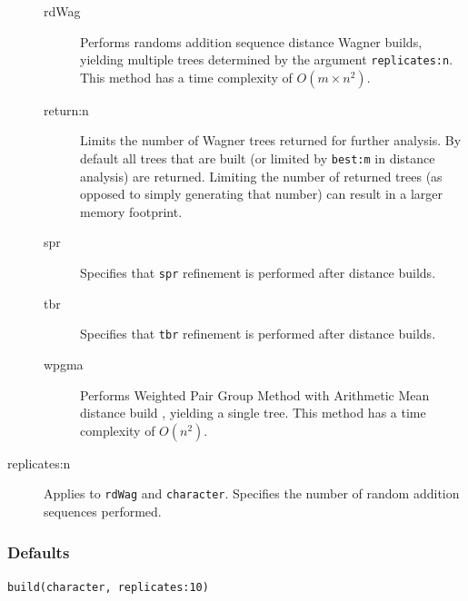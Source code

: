 \begin{description}
\begin{description}
			\item[rdWag] Performs randoms addition sequence distance Wagner builds, 
			yielding multiple trees determined by the argument \texttt{replicates:n}. This 
			method has a time complexity of $O(m \times n^2)$.
			
			\item[return:n] Limits the number of Wagner trees returned for further analysis.  By default
			all trees that are built (or limited by \texttt{best:m} in distance analysis) are returned.
			Limiting the number of returned trees (as opposed to simply generating that number) can result in
			a larger memory footprint.

			\item[spr] Specifies that \texttt{spr} refinement \citep{Dayhoff1969} is performed 
			after distance builds.

			\item[tbr] Specifies that \texttt{tbr} refinement \citep{Farris1988, swofford1990a} 
			is performed after distance builds.
		
			\item[wpgma] Performs Weighted Pair Group Method with Arithmetic Mean 
			distance build \citep{SokalandMichener1958}, yielding a single tree. This method 
			has a time complexity of $O(n^2)$.
		\end{description}

		\item [replicates:n] Applies to \texttt{rdWag} and \texttt{character}. Specifies the number of 
		random addition sequences performed.
	
	\end{description}		

	\subsubsection{Defaults}
		\texttt{build(character, replicates:10)}
		
